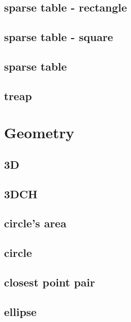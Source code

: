\documentclass[a4paper,5pt,twocolumn,titlepage]{article}
\begin{document}
\subsection{sparse table - rectangle}

\subsection{sparse table - square}

\subsection{sparse table}

\subsection{treap}


\section{Geometry}
\subsection{3D}

\subsection{3DCH}

\subsection{circle's area}

\subsection{circle}

\subsection{closest point pair}

\subsection{ellipse}

\end{document}

